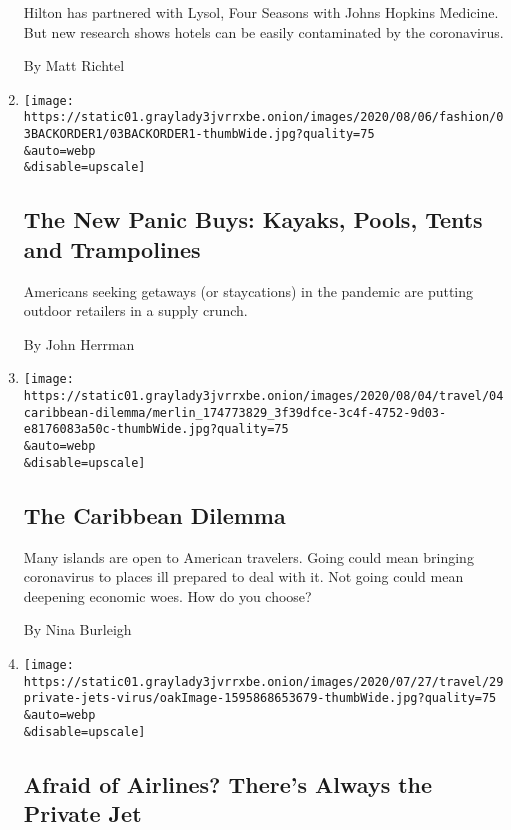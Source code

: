 \begin{enumerate}
  Hilton has partnered with Lysol, Four Seasons with Johns Hopkins
  Medicine. But new research shows hotels can be easily contaminated by
  the coronavirus.

  By Matt Richtel
\item
  \href{/2020/08/04/style/outdoor-camping-gear-pools-backordered.html}{}

  \texttt{[image: https://static01.graylady3jvrrxbe.onion/images/2020/08/06/fashion/03BACKORDER1/03BACKORDER1-thumbWide.jpg?quality=75\\\&auto=webp\\\&disable=upscale]}

  \hypertarget{the-new-panic-buys-kayaks-pools-tents-and-trampolines}{%
  \subsection{The New Panic Buys: Kayaks, Pools, Tents and
  Trampolines}\label{the-new-panic-buys-kayaks-pools-tents-and-trampolines}}

  Americans seeking getaways (or staycations) in the pandemic are
  putting outdoor retailers in a supply crunch.

  By John Herrman
\item
  \href{/2020/08/04/travel/coronavirus-caribbean-vacations.html}{}

  \texttt{[image: https://static01.graylady3jvrrxbe.onion/images/2020/08/04/travel/04caribbean-dilemma/merlin\_174773829\_3f39dfce-3c4f-4752-9d03-e8176083a50c-thumbWide.jpg?quality=75\\\&auto=webp\\\&disable=upscale]}

  \hypertarget{the-caribbean-dilemma}{%
  \subsection{The Caribbean Dilemma}\label{the-caribbean-dilemma}}

  Many islands are open to American travelers. Going could mean bringing
  coronavirus to places ill prepared to deal with it. Not going could
  mean deepening economic woes. How do you choose?

  By Nina Burleigh
\item
  \href{/2020/07/30/travel/private-jets-coronavirus.html}{}

  \texttt{[image: https://static01.graylady3jvrrxbe.onion/images/2020/07/27/travel/29private-jets-virus/oakImage-1595868653679-thumbWide.jpg?quality=75\\\&auto=webp\\\&disable=upscale]}

  \hypertarget{afraid-of-airlines-theres-always-the-private-jet}{%
  \subsection{Afraid of Airlines? There's Always the Private
  Jet}\label{afraid-of-airlines-theres-always-the-private-jet}}


\end{enumerate}
